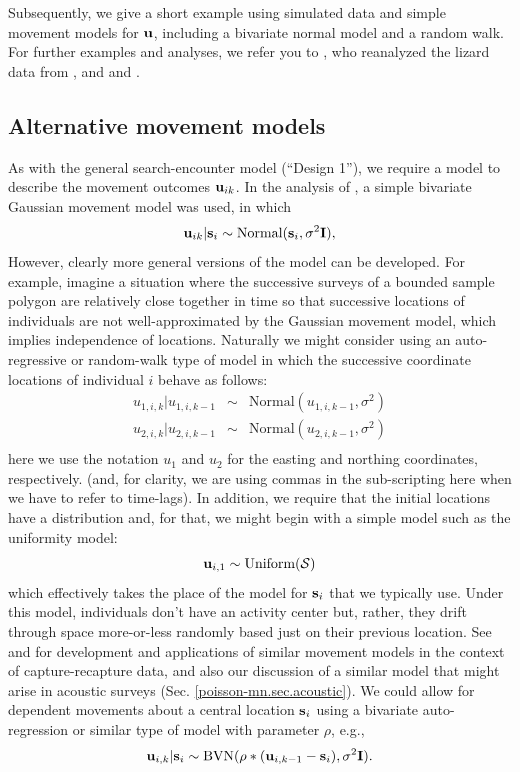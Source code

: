 Subsequently, we give a short example using simulated data and 
simple movement models for ${\bf u}$, including a bivariate normal
model and a random walk. 
For further examples and analyses, we refer you to
\citet{royle_dorazio:2008}, who reanalyzed the lizard data from
\citet{royle_young:2008}, and \citet{efford:2011ecol} and
\citet{marques_etal:2011}.



\subsection{Alternative movement models}
\label{searchencounter.sec.movement}

As with the general search-encounter model (``Design 1''), we require
a model to describe the movement outcomes ${\bf u}_{ik}$.
In the analysis of \citet{royle_young:2008}, a simple bivariate
Gaussian movement model was used, in which
\[
 {\bf u}_{ik} | {\bf s}_{i} \sim \mbox{Normal}({\bf s}_{i}, \sigma^{2}{\bf I}),
\]
However, clearly more general versions of the model can be developed.
For example, imagine a situation where the successive surveys of a
bounded sample polygon are relatively close together in time so that
successive locations of individuals are not well-approximated by the
Gaussian movement model, which implies independence of
locations. Naturally we might consider using an auto-regressive or
random-walk type of model in which the successive coordinate locations
of individual $i$ behave as follows:
\begin{eqnarray*}
 u_{1,i,k} | u_{1,i,k-1} &\sim &  \mbox{Normal}( u_{1,i,k-1},  \sigma^{2}) \\
 u_{2,i,k} | u_{2,i,k-1} &\sim &  \mbox{Normal}( u_{2,i,k-1},  \sigma^{2}) \\
\end{eqnarray*}
here we use the notation $u_{1}$ and $u_{2}$ for the easting and
northing coordinates, respectively. (and, for clarity, we are using
commas in the sub-scripting here when we have to refer to time-lags).
 In addition, we require that the initial locations have a
distribution and, for that, we might begin with a simple model such as
the uniformity model:
\[
 {\bf u}_{i,1} \sim \mbox{Uniform}({\cal S})
\]
which effectively takes the place of the model for ${\bf s}_{i}$ that
we typically use. Under this model, individuals don't have an activity
center but, rather, they drift through space more-or-less randomly
based just on their previous location. See \citet{ovaskainen:2004} and
\citet{ovaskainen_etal:2008} for development and applications of similar
movement models in the context of capture-recapture data,
and also our discussion of a similar model that might arise in
acoustic surveys (Sec. \ref{poisson-mn.sec.acoustic}).  We could allow
for dependent movements about a central location ${\bf s}_{i}$ using a
bivariate auto-regression or similar type of model with parameter
$\rho$, e.g.,
\[
 {\bf u}_{i,k} | {\bf s}_{i} \sim   \mbox{BVN}( \rho*( {\bf u}_{i,k-1} - {\bf s}_{i} ),  \sigma^{2} {\bf I}).
\]

